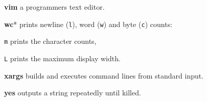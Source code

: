 \textbf{vim} a programmers text editor.

\textbf{wc}* prints newline (\texttt{l}), word (\texttt{w}) and byte (\texttt{c}) counts:
\begin{enumx}
	\item [\texttt{m}] prints the character counts,
	\item [\texttt{L}] prints the maximum display width.
\end{enumx}

\textbf{xargs} builds and executes command lines from standard input.

\textbf{yes} outputs a string repeatedly until killed.
